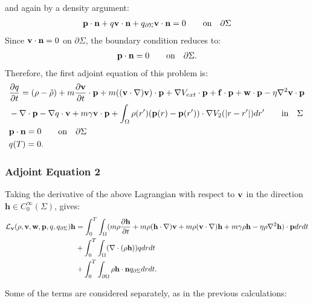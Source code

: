 and again by a density argument:
\begin{align*}
 \mathbf{p} \cdot \mathbf{n}  +  q \mathbf{v} \cdot \mathbf{n}   +q_{\partial \Sigma} \mathbf{v} \cdot \mathbf{n} = 0\qquad \text{on} \quad \partial \Sigma
\end{align*}
Since $\mathbf{v} \cdot \mathbf{n} =0$ on $ \partial \Sigma$, the boundary condition reduces to:
\begin{align*}
\mathbf{p} \cdot \mathbf{n} = 0 \qquad \text{on} \quad \partial \Sigma.
\end{align*}
Therefore, the first adjoint equation of this problem is:
\begin{align}
\label{INAdj1}
& \frac{\partial q}{\partial t} = (\rho - \hat {\rho}) +m  \frac{\partial \mathbf{v}}{\partial t}\cdot \mathbf{p} + m ( (\mathbf{v} \cdot \nabla)\mathbf{v}) \cdot \mathbf{p}+ \nabla V_{ext}\cdot \mathbf{p} + \mathbf{f} \cdot \mathbf{p} + \mathbf{w} \cdot \mathbf{p}  - \eta \nabla^2 \mathbf{v} \cdot \mathbf{p}  \\
&-\nabla\cdot \mathbf{p}  -  \nabla q \cdot \mathbf{v} + m \gamma \mathbf{v} \cdot \mathbf{p} + \int_\Omega  \rho(r')(\mathbf{p}(r) - \mathbf{p}(r')) \cdot\nabla V_2(|r-r'|)   dr' \qquad \text{in} \quad \Sigma\notag \\
& \mathbf{p} \cdot \mathbf{n} = 0 \qquad \text{on} \quad \partial \Sigma\notag\\
 &q(T) = {0} . \notag
\end{align}

\subsubsection{Adjoint Equation 2}
Taking the derivative of the above Lagrangian with respect to $\mathbf{v}$ in the direction $\mathbf{h} \in C_0^\infty(\Sigma)$, gives:
\begin{align*}
\mathcal{L}_{\mathbf{v}}(\rho,\mathbf{v},\mathbf{w},\mathbf{p},q,q_{\partial \Sigma})\mathbf{h} &=  \int_0^T \int_\Omega (m \rho \frac{\partial \mathbf{h} }{\partial t} + m \rho (\mathbf{h} \cdot \nabla)\mathbf{v} + m \rho (\mathbf{v} \cdot \nabla)\mathbf{h} + m \gamma \rho \mathbf{h} - \eta \rho \nabla^2 \mathbf{h}) \cdot \mathbf{p} dr dt\\
& + \int_0^T \int_\Omega ( \nabla \cdot (\rho \mathbf{h})) q dr dt\\ 
& +\int_0^T \int_{\partial\Omega} \rho \mathbf{h} \cdot \mathbf{n} q_{\partial \Sigma} dr dt.
\end{align*}

Some of the terms are considered separately, as in the previous calculations:

